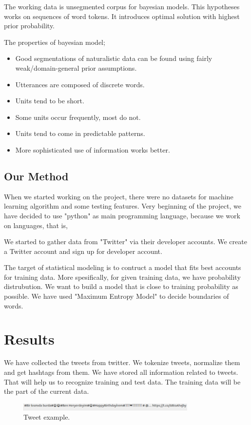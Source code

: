 \documentclass[12pt]{comjnl}
\begin{document}
The working data is unsegmented corpus for bayesian models. This hypotheses works on sequences of word tokens.
It introduces optimal solution with highest prior probability.

The properties of bayesian model;
\begin{itemize}
\item Good segmentations of naturalistic data can be found using fairly weak/domain-general prior assumptions.
\item Utterances are composed of discrete words.
\item Units tend to be short.
\item Some units occur frequently, most do not.
\item Units tend to come in predictable patterns.
\item More sophisticated use of information works better.
\end{itemize}

\subsection{Our Method}
When we started working on the project, there were no datasets for machine learning algorithm and some testing features.
Very beginning of the project, we have decided to use "python" as main programming language, because we work on languages, that is, 

We started to gather data from "Twitter" via their developer accounts. We create a Twitter account and sign up for developer account.





The target of statistical modeling is to contruct a model that fits best accounts for training data. More spesifically, for given training data, we have probability distrubution. We want to build a model that is close to training probability as possible.
We have used "Maximum Entropy Model" to decide boundaries of words. 


\section{Results}
We have collected the tweets from twitter. We tokenize tweets, normalize them and get 
hashtags from them. We have stored all information related to tweets. That will help us to recognize training and test data. The training data will be the part of the current data.

\begin{figure}[htbp]
\centering
\includegraphics[width=3.5in]{tweet.png}
\caption{Tweet example.}\label{fig:Tweet}
\end{figure}
\end{document}
